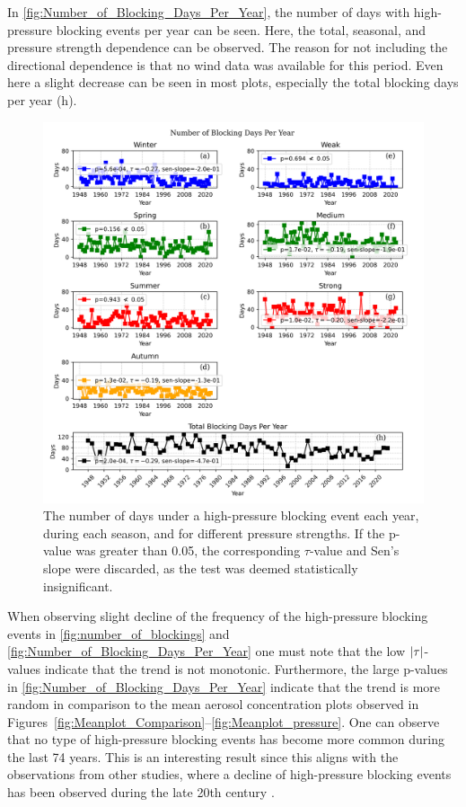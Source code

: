 In \autoref{fig:Number_of_Blocking_Days_Per_Year}, the number of days with high-pressure blocking events per year can be seen. Here, the total, seasonal, and pressure strength dependence can be observed. The reason for not including the directional dependence is that no wind data was available for this period. Even here a slight decrease can be seen in most plots, especially the total blocking days per year (h). 


\begin{figure}[H]
    \centering
    \includegraphics[width=\textwidth]{Figures/blocking_days_per_year_all.png}
    \caption{The number of days under a high-pressure blocking event each year, during each season, and for different pressure strengths. If the p-value was greater than 0.05, the corresponding $\tau$-value and Sen's slope were discarded, as the test was deemed statistically insignificant.} 
    \label{fig:Number_of_Blocking_Days_Per_Year}
\end{figure}

When observing slight decline of the frequency of the high-pressure blocking events in \autoref{fig:number_of_blockings} and \autoref{fig:Number_of_Blocking_Days_Per_Year} one must note that the low $\left| \tau \right|$-values indicate that the trend is not monotonic. Furthermore, the large p-values in \autoref{fig:Number_of_Blocking_Days_Per_Year} indicate that the trend is more random in comparison to the mean aerosol concentration plots observed in Figures~\ref{fig:Meanplot_Comparison}--\ref{fig:Meanplot_pressure}. One can observe that no type of high-pressure blocking events has become more common during the last 74 years. This is an interesting result since this aligns with the observations from other studies, where a decline of high-pressure blocking events has been observed during the late 20th century \cite{lupoAtmosphericBlockingEvents2020}. 
